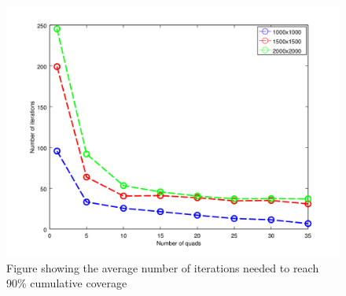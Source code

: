 \documentclass{article}
\begin{document}
\begin{figure}[h!]

    \includegraphics[width=1\columnwidth]{tasefigs/perf_quads.png}

    \caption{Figure showing the average number of iterations needed to reach
        90\% cumulative coverage}

    \label{fig:nqs_cum}

\end{figure}

 
\end{document}
